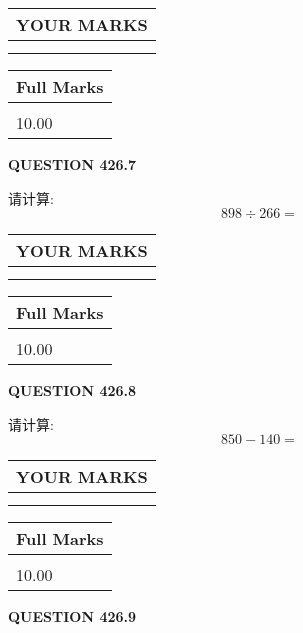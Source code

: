 \documentclass{ctexart}
\begin{document}
 
  
\vspace{0.2in}
  
\noindent\begin{tabular}{|l|}
\hline
 YOUR MARKS  \\
\hline
 \\ 
 \\ 
\hline
\end{tabular}
\hspace{0.05in} \begin{tabular}{|l|}
\hline
 Full Marks  \\
\hline
 \\ 
10.00 \\
\hline
\end{tabular}
{\textbf{\Large{QUESTION
426.7 
}}}
  
  
 
请计算:
\begin{equation}
898  \div    %
266 = \nonumber
\end{equation}
 

 

 
  
\vspace{0.2in}
  
\noindent\begin{tabular}{|l|}
\hline
 YOUR MARKS  \\
\hline
 \\ 
 \\ 
\hline
\end{tabular}
\hspace{0.05in} \begin{tabular}{|l|}
\hline
 Full Marks  \\
\hline
 \\ 
10.00 \\
\hline
\end{tabular}
{\textbf{\Large{QUESTION
426.8 
}}}
  
  
 
请计算:
\begin{equation}
850 -   %
140 = \nonumber
\end{equation}
 

 

 
  
\vspace{0.2in}
  
\noindent\begin{tabular}{|l|}
\hline
 YOUR MARKS  \\
\hline
 \\ 
 \\ 
\hline
\end{tabular}
\hspace{0.05in} \begin{tabular}{|l|}
\hline
 Full Marks  \\
\hline
 \\ 
10.00 \\
\hline
\end{tabular}
{\textbf{\Large{QUESTION
426.9 
}}}
  
\end{document}
